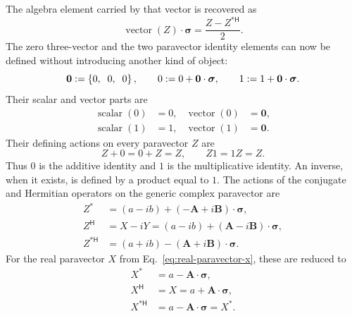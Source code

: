 \documentclass[10pt,letterpaper]{article}
\newcommand{\eqfunc}[1]{\operatorname{#1}}
\newcommand{\pv}[1]{#1}
\newcommand{\vct}[1]{\mathbf{#1}}
\newcommand{\sigv}{\vct{\pv{\bm{\sigma}}}}
\newcommand{\Hop}{\mathsf H}
\newcommand{\herm}[1]{#1^{\Hop}}
\newcommand{\conj}[1]{#1^{*}}
\newcommand{\cherm}[1]{#1^{*\Hop}}
\newcommand{\vthree}[3]{%
  \left\{#1,\mkern10mu #2,\mkern10mu #3\right\}%
}
\begin{document}
The algebra element carried by that vector is recovered as
\begin{equation}
\eqfunc{vector}(\pv{Z})\cdot\sigv
=\frac{\pv{Z}-\cherm{\pv{Z}}}{2}.
\label{eq:vector-recovery}
\end{equation}
The zero three-vector and the two paravector identity elements can now be
defined without introducing another kind of object:
\begin{equation}
\vct{0}:=\vthree{0}{0}{0},
\qquad
\pv{0}:=0+\vct{0}\cdot\sigv,
\qquad
\pv{1}:=1+\vct{0}\cdot\sigv.
\label{eq:paravector-identities}
\end{equation}
Their scalar and vector parts are
\begin{equation}
\begin{aligned}
\eqfunc{scalar}(\pv{0})&=0,
&
\eqfunc{vector}(\pv{0})&=\vct{0},\\
\eqfunc{scalar}(\pv{1})&=1,
&
\eqfunc{vector}(\pv{1})&=\vct{0}.
\end{aligned}
\label{eq:identity-components}
\end{equation}
Their defining actions on every paravector \(\pv{Z}\) are
\begin{equation}
\pv{Z}+\pv{0}=\pv{0}+\pv{Z}=\pv{Z},
\qquad
\pv{Z}\pv{1}=\pv{1}\pv{Z}=\pv{Z}.
\label{eq:algebra-identities}
\end{equation}
Thus \(\pv{0}\) is the additive identity and \(\pv{1}\) is the
multiplicative identity. An inverse, when it exists, is defined by a product
equal to \(\pv{1}\).
The actions of the conjugate and Hermitian operators on the generic complex paravector are
\begin{align}
\conj{\pv{Z}} &= (a-ib)+(-\vct{A}+i\vct{B})\cdot\sigv,
\label{eq:paravector-conjugate}\\
\herm{\pv{Z}} &= \pv{X}-i\pv{Y}=(a-ib)+(\vct{A}-i\vct{B})\cdot\sigv,
\label{eq:paravector-reverse}\\
\cherm{\pv{Z}} &= (a+ib)-(\vct{A}+i\vct{B})\cdot\sigv.
\label{eq:paravector-reverse-conjugate}
\end{align}
For the real paravector \(\pv{X}\) from Eq.\ \eqref{eq:real-paravector-x}, these are reduced to
\begin{align}
\conj{\pv{X}} &= a-\vct{A}\cdot\sigv,
\label{eq:real-paravector-conjugate}\\
\herm{\pv{X}} &= \pv{X}=a+\vct{A}\cdot\sigv,
\label{eq:real-paravector-reverse}\\
\cherm{\pv{X}} &= a-\vct{A}\cdot\sigv=\conj{\pv{X}}.
\label{eq:real-paravector-combined}
\end{align}
\end{document}
